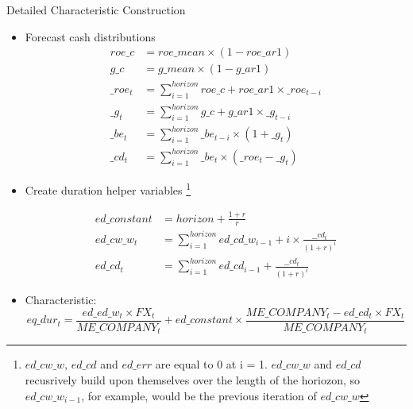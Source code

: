 \documentclass[12pt,title,fleqn]{article}
\begin{document}
\begin{section}{Detailed Characteristic Construction}
\begin{itemize}
\begin{itemize}
                \item Forecast cash distributions
                    \begin{align*}
                        roe\_c &= roe\_mean \times (1 - roe\_ar1) \\
                        g\_c &= g\_mean \times (1 - g\_ar1) \\
                        \_roe_t &= \sum_{i = 1}^{horizon} roe\_c + roe\_ar1 \times \_roe_{t-i} \\
                        \_g_t &= \sum_{i = 1}^{horizon} g\_c + g\_ar1 \times \_g_{t-i} \\
                        \_be_t& = \sum_{i = 1}^{horizon} \_be_{t-i} \times (1 + \_g_t) \\
                        \_cd_t &= \sum_{i = 1}^{horizon} \_be_t \times (\_roe_t - \_g_t)
                    \end{align*}

                \item Create duration helper variables \footnote{ $ed\_cw\_w$, $ed\_cd$ and $ed\_err$ are equal to 0 at i = 1. $ed\_cw\_w$ and $ed\_cd$ recusrively build upon themselves over the length of the horiozon, so $ed\_cw\_w_{i-1}$, for example, would be the previous iteration of $ed\_cw\_w$}
                    
                    \begin{align*}
                        ed\_constant &= horizon + \frac{1 + r}{r} \\
                        ed\_cw\_w_t &= \sum_{i = 1}^{horizon} ed\_cd\_w_{i - 1} + i \times \frac{\_\_cd_t}{(1 + r)^i} \\ 
                        ed\_cd_t &= \sum_{i = 1}^{horizon} ed\_cd_{i - 1} + \frac{\_\_cd_t}{(1 + r)^i}
                    \end{align*}

                \item Characteristic:
                    \begin{equation*}
                        eq\_dur_t = \frac{ed\_ed\_w_t \times FX_t}{ME\_COMPANY_t} + ed\_constant \times \frac{ME\_COMPANY_t - ed\_cd_t \times FX_t}{ME\_COMPANY_t}
                    \end{equation*}
            \end{itemize}
            

\end{itemize}
\end{section}
\end{document}
